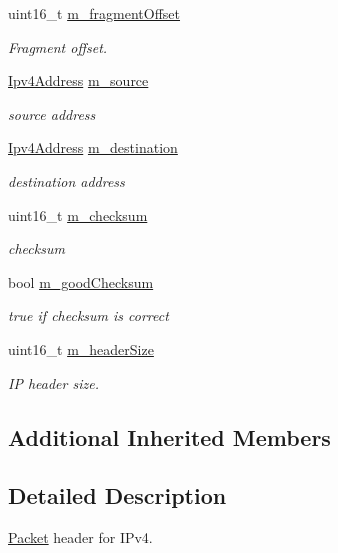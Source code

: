 \begin{DoxyCompactItemize}
uint16\+\_\+t \hyperlink{classns3_1_1Ipv4Header_a1da1027ec79b8089450cad8cc726e1dd}{m\+\_\+fragment\+Offset}
\begin{DoxyCompactList}\small\item\em Fragment offset. \end{DoxyCompactList}\item 
\hyperlink{classns3_1_1Ipv4Address}{Ipv4\+Address} \hyperlink{classns3_1_1Ipv4Header_a091c4da29779b7e0f4b4a486d04ed012}{m\+\_\+source}
\begin{DoxyCompactList}\small\item\em source address \end{DoxyCompactList}\item 
\hyperlink{classns3_1_1Ipv4Address}{Ipv4\+Address} \hyperlink{classns3_1_1Ipv4Header_a8953985e448341b24e4ac59bf50f4067}{m\+\_\+destination}
\begin{DoxyCompactList}\small\item\em destination address \end{DoxyCompactList}\item 
uint16\+\_\+t \hyperlink{classns3_1_1Ipv4Header_a9d1b68b18a491543fd34d5b233c5a22a}{m\+\_\+checksum}
\begin{DoxyCompactList}\small\item\em checksum \end{DoxyCompactList}\item 
bool \hyperlink{classns3_1_1Ipv4Header_a66c37ec6d5bd2c00aa6c6d7c60e23f12}{m\+\_\+good\+Checksum}
\begin{DoxyCompactList}\small\item\em true if checksum is correct \end{DoxyCompactList}\item 
uint16\+\_\+t \hyperlink{classns3_1_1Ipv4Header_aa34d84bf45829eefd5c14f34be1d7dce}{m\+\_\+header\+Size}
\begin{DoxyCompactList}\small\item\em IP header size. \end{DoxyCompactList}\end{DoxyCompactItemize}
\subsection*{Additional Inherited Members}


\subsection{Detailed Description}
\hyperlink{classns3_1_1Packet}{Packet} header for I\+Pv4. 

